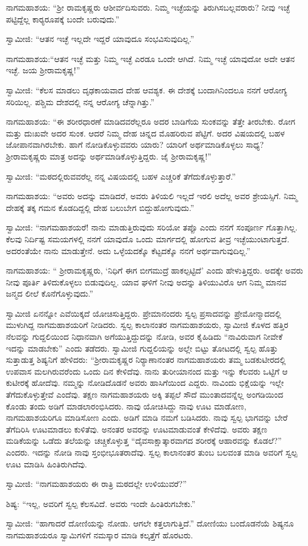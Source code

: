\vskip 1pt

 ನಾಗಮಹಾಶಯ: “ಶ‍್ರೀ ರಾಮಕೃಷ್ಣರು ಆಶೀರ್ವದಿಸುವರು. ನಿಮ್ಮ ಇಚ್ಛೆಯನ್ನು ತಿರುಗಿಸಬಲ್ಲವರಾರು? ನೀವು ಇಚ್ಛೆ ಪಟ್ಟಿದ್ದೆಲ್ಲ ಕಾರ‍್ಯರೂಪಕ್ಕೆ ಬಂದೇ‌ ಬರುವುದು.” 

\vskip 1pt

 ಸ್ವಾಮೀಜಿ: “ಆತನ ಇಚ್ಛೆ ಇಲ್ಲದೇ ಇದ್ದರೆ ಯಾವುದೂ ಸಂಭವಿಸುವುದಿಲ್ಲ.” 

\vskip 1pt

 ನಾಗಮಹಾಶಯ:‌“ಆತನ ಇಚ್ಛೆ ಮತ್ತು ನಿಮ್ಮ ಇಚ್ಛೆ ಎರಡೂ ಒಂದೇ ಆಗಿದೆ. ನಿಮ್ಮ ಇಚ್ಛೆ ಯಾವುದೋ ಅದೇ ಆತನ ಇಚ್ಛೆ. ಜಯ ಶ‍್ರೀರಾಮಕೃಷ್ಣ!” 

 ಸ್ವಾಮೀಜಿ: “ಕೆಲಸ ಮಾಡಲು ದೃಢಕಾಯವಾದ ದೇಹ ಆವಶ್ಯಕ. ಈ ದೇಶಕ್ಕೆ ಬಂದಾಗಿನಿಂದಲೂ ನನಗೆ ಆರೋಗ್ಯ ಸರಿಯಿಲ್ಲ. ಪಶ್ಚಿಮ ದೇಶದಲ್ಲಿ ನನ್ನ ಆರೋಗ್ಯ ಚೆನ್ನಾಗಿತ್ತು.” 

 ನಾಗಮಹಾಶಯ: “ಈ ಶರೀರಧಾರಣೆ ಮಾಡಿದವರೆಲ್ಲರೂ ಅದರ ಬಾಡಿಗೆಯ ಸುಂಕವನ್ನು ತೆತ್ತೇ ತೀರಬೇಕು. ರೋಗ ಮತ್ತು ದುಃಖವೇ ಅದರ ಸುಂಕ. ಆದರೆ ನಿಮ್ಮ ದೇಹ ಚಿನ್ನದ ಮೊಹರಿರುವ ಪೆಟ್ಟಿಗೆ. ಅದರ ವಿಷಯದಲ್ಲಿ ಬಹಳ ಜೋಪಾನವಾಗಿರಬೇಕು. ಹಾಗೆ ನೋಡಿಕೊಳ್ಳುವವರು ಯಾರು? ಯಾರಿಗೆ ಅರ್ಥಮಾಡಿಕೊಳ್ಳಲು ಸಾಧ್ಯ? ಶ‍್ರೀರಾಮಕೃಷ್ಣರು ಮಾತ್ರ ಅದನ್ನು ಅರ್ಥಮಾಡಿಕೊಳ್ಳುತ್ತಿದ್ದರು. ಜೈ ಶ‍್ರೀರಾಮಕೃಷ್ಣ!” 

 ಸ್ವಾಮೀಜಿ: “ಮಠದಲ್ಲಿರುವವರೆಲ್ಲ ನನ್ನ ವಿಷಯದಲ್ಲಿ ಬಹಳ ಎಚ್ಚರಿಕೆ ತೆಗೆದುಕೊಳ್ಳುತ್ತಾರೆ.” 

 ನಾಗಮಹಾಶಯ: “ಅವರು ಅದನ್ನು ಮಾಡಿದರೆ, ಅವರು ತಿಳಿಯಲಿ ಇಲ್ಲದೆ ಇರಲಿ ಅದೆಲ್ಲ ಅವರ ಶ್ರೇಯಸ್ಸಿಗೆ. ನಿಮ್ಮ ದೇಹಕ್ಕೆ ತಕ್ಕ ಗಮನ ಕೊಡದಿದ್ದಲ್ಲಿ ದೇಹ ಬಲುಬೇಗ ಬಿದ್ದುಹೋಗುವುದು.” 

 ಸ್ವಾಮೀಜಿ: “ನಾಗಮಹಾಶಯರೆ! ನಾನು ಮಾಡುತ್ತಿರುವುದು ಸರಿಯೋ ತಪ್ಪೊ ಎಂದು ನನಗೆ ಸಂಪೂರ್ಣ ಗೊತ್ತಾಗಿಲ್ಲ. ಕೆಲವು ನಿರ್ದಿಷ್ಟ ಸಮಯಗಳಲ್ಲಿ ನನಗೆ ಯಾವುದೊ ಒಂದು ಮಾರ್ಗದಲ್ಲಿ ಹೋಗುವ ತೀವ್ರ ಇಚ್ಛೆಯುಂಟಾಗುತ್ತದೆ. ಅದರಂತೆಯೇ ನಾನು ಮಾಡುತ್ತೇನೆ. ಅದು ಒಳ್ಳೆಯದಕ್ಕೊ ಕೆಟ್ಟದಕ್ಕೊ ನನಗೆ ಅರ್ಥವಾಗುವುದಿಲ್ಲ.” 

 ನಾಗಮಹಾಶಯ: “ ಶ‍್ರೀರಾಮಕೃಷ್ಣರು, ‘ನಿಧಿಗೆ ಈಗ ಬೀಗಮುದ್ರೆ ಹಾಕಲ್ಪಟ್ಟಿದೆ’ ಎಂದು ಹೇಳುತ್ತಿದ್ದರು. ಅದಕ್ಕೇ ಅವರು ನೀವು ಪೂರ್ತಿ ತಿಳಿದುಕೊಳ್ಳಲು ಬಿಡುವುದಿಲ್ಲ. ಯಾವ ಘಳಿಗೆ ನೀವು ಅದನ್ನು ತಿಳಿಯುವಿರೊ ಆಗ ನಿಮ್ಮ ಮಾನವ ಜನ್ಮದ ಲೀಲೆ ಕೊನೆಗೊಳ್ಳುವುದು.” 

 ಸ್ವಾಮೀಜಿ ಏನನ್ನೋ ಎವೆಯಿಕ್ಕದೆ ಯೋಚಿಸುತ್ತಿದ್ದರು. ಪ್ರೇಮಾನಂದರು ಸ್ವಲ್ಪ ಪ್ರಸಾದವನ್ನು ಪ್ರೇಮೋನ್ಮಾದದಲ್ಲಿ ಮುಳುಗಿದ್ದ ನಾಗಮಹಾಶಯರಿಗೆ ನೀಡಿದರು. ಸ್ವಲ್ಪ ಕಾಲಾನಂತರ ನಾಗಮಹಾಶಯರು, ಸ್ವಾಮೀಜಿ ಕೊಳದ ಹತ್ತಿರ ನೆಲವನ್ನು ಗುದ್ದಲಿಯಿಂದ ನಿಧಾನವಾಗಿ ಅಗೆಯುತ್ತಿದ್ದುದನ್ನು ನೋಡಿ, ಅವರ ಕೈಹಿಡಿದು “ನಾವಿರುವಾಗ ನೀವೇಕೆ ಇದನ್ನು ಮಾಡಬೇಕು” ಎಂದು ತಡೆದರು. ಸ್ವಾಮೀಜಿ ಗುದ್ದಲಿಯನ್ನು ಅಲ್ಲೇ ಬಿಟ್ಟು ತೋಟದಲ್ಲಿ ಸ್ವಲ್ಪ ಹೊತ್ತು ಸುತ್ತಾಡುತ್ತ ಶಿಷ್ಯನಿಗೆ ಹೇಳಿದರು: “ಶ‍್ರೀರಾಮಕೃಷ್ಣರ ನಿರ‍್ಯಾಣಾನಂತರ ನಾಗಮಹಾಶಯರು ತಮ್ಮ ಬಡಕುಟೀರದಲ್ಲಿ ಉಪವಾಸ ಮಲಗಿರುವರೆಂದು ಒಂದು ದಿನ ಕೇಳಿದೆವು. ನಾನು ತುರೀಯಾನಂದ ಮತ್ತು ಇನ್ನು ಕೆಲವರು ಒಟ್ಟಿಗೆ ಆ‌ ಕುಟೀರಕ್ಕೆ ಹೋದೆವು. ನಮ್ಮನ್ನು ನೋಡಿದೊಡನೆ ಅವರು ಹಾಸಿಗೆಯಿಂದ ಎದ್ದರು. ನಾವಿಂದು ಭಿಕ್ಷೆಯನ್ನು ಇಲ್ಲೇ ತೆಗೆದುಕೊಳ್ಳುತ್ತೇವೆ ಎಂದೆವು. ತಕ್ಷಣ ನಾಗಮಹಾಶಯರು ಅಕ್ಕಿ ತಪ್ಪಲೆ ಸೌದೆ ಮುಂತಾದವನ್ನೆಲ್ಲ ಅಂಗಡಿಯಿಂದ ಕೊಂಡು ತಂದು ಅಡಿಗೆ ಮಾಡಲಾರಂಭಿಸಿದರು. ನಾವು ಯೋಚಿಸಿದ್ದು ನಾವು ಊಟ ಮಾಡೋಣ, ನಾಗಮಹಾಶಯರಿಗೂ ಮಾಡಿಸೋಣ ಎಂದು. ಅಡಿಗೆ ಮಾಡಿ ನಮಗೆ ಬಡಿಸಿದರು. ನಾವು ಸ್ವಲ್ಪ ಭಾಗವನ್ನು ಬೇರೆ ತೆಗೆದಿರಿಸಿ ಊಟಮಾಡಲು ಕುಳಿತೆವು. ಅನಂತರ ಅವರನ್ನು ಊಟಮಾಡುವಂತೆ ಕೇಳಿದೆವು. ಅವರು ತಕ್ಷಣ ಮಡಿಕೆಯನ್ನು ಒಡೆದು ತಲೆಯನ್ನು ಚಚ್ಚಿಕೊಳ್ಳುತ್ತ “ದೈವಸಾಕ್ಷಾತ್ಕಾರವಾಗದ ಶರೀರಕ್ಕೆ ಆಹಾರವನ್ನು ಕೊಡಲೆ?” ಎಂದರು. ಇದನ್ನು ನೋಡಿ ನಾವು ಸ್ತಂಭೀಭೂತರಾದೆವು. ಸ್ವಲ್ಪ ಕಾಲಾನಂತರ ತುಂಬ ಬಲವಂತ ಮಾಡಿ ಅವರಿಗೆ ಸ್ವಲ್ಪ ಊಟ ಮಾಡಿಸಿ ಹಿಂತಿರುಗಿದೆವು. 

 ಸ್ವಾಮೀಜಿ: “ನಾಗಮಹಾಶಯರು ಈ ರಾತ್ರಿ ಮಠದಲ್ಲೇ ಉಳಿಯುವರೆ?” 

 ಶಿಷ್ಯ: “ಇಲ್ಲ, ಅವರಿಗೆ ಸ್ವಲ್ಪ ಕೆಲಸವಿದೆ. ಅವರು ಇಂದೇ ಹಿಂತಿರುಗಬೇಕು.” 

 ಸ್ವಾಮೀಜಿ: “ಹಾಗಾದರೆ ದೋಣಿಯನ್ನು ನೋಡು. ಆಗಲೇ ಕತ್ತಲಾಗುತ್ತಿದೆ.” ದೋಣಿಯು ಬಂದೊಡನೆಯೆ ಶಿಷ್ಯನೂ ನಾಗಮಹಾಶಯರೂ ಸ್ವಾಮಿಗಳಿಗೆ ನಮಸ್ಕಾರ ಮಾಡಿ ಕಲ್ಕತ್ತೆಗೆ ಹೊರಟರು. 

